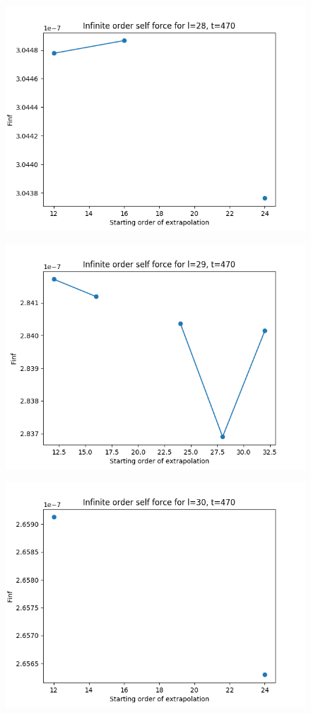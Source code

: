 \documentclass{article}
\begin{document}
\begin{figure}
  \includegraphics{bestfinfselectorplott470l28}
\end{figure}
\begin{figure}
  \includegraphics{bestfinfselectorplott470l29}
\end{figure}
\begin{figure}
  \includegraphics{bestfinfselectorplott470l30}
\end{figure}
\end{document}
